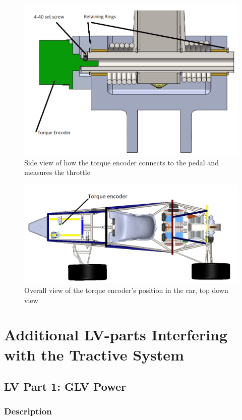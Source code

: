 \documentclass{article}
\begin{document}
        \begin{figure}[H]
            \centering
            \includegraphics[width = 0.7 \textwidth]{torqueside}
            \caption{Side view of how the torque encoder connects to the pedal and measures the throttle}
            \label{torqside}
        \end{figure}

        \begin{figure}[H]
            \centering
            \includegraphics[width = 0.7 \textwidth]{torquefullcar}
            \caption{Overall view of the torque encoder's position in the car, top down view}
            \label{torquetopdown}
        \end{figure}

\newpage

\section{Additional LV-parts Interfering with the Tractive System}

    \subsection{LV Part 1: GLV Power}

        \subsubsection{Description}
\end{document}
